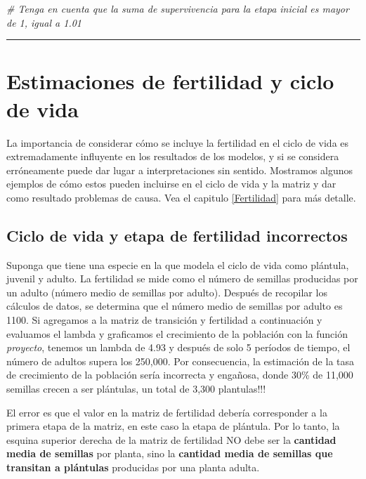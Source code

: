 \documentclass[
]{book}
\newenvironment{Shaded}{\begin{snugshade}}{\end{snugshade}}
\newcommand{\CommentTok}[1]{\textcolor[rgb]{0.56,0.35,0.01}{\textit{#1}}}
\theoremstyle{definition}
\theoremstyle{definition}
\theoremstyle{definition}
\theoremstyle{definition}
\theoremstyle{remark}
\begin{document}
\begin{Shaded}
\begin{Highlighting}[]
\CommentTok{\# Tenga en cuenta que la suma de supervivencia para la etapa inicial es mayor de 1, igual a 1.01}
\end{Highlighting}
\end{Shaded}

\begin{center}\rule{0.5\linewidth}{0.5pt}\end{center}

\section{Estimaciones de fertilidad y ciclo de vida}\label{estimaciones-de-fertilidad-y-ciclo-de-vida}

La importancia de considerar cómo se incluye la fertilidad en el ciclo de vida es extremadamente influyente en los resultados de los modelos, y si se considera erróneamente puede dar lugar a interpretaciones sin sentido. Mostramos algunos ejemplos de cómo estos pueden incluirse en el ciclo de vida y la matriz y dar como resultado problemas de causa. Vea el capitulo \ref{Fertilidad} para más detalle.

\subsection{Ciclo de vida y etapa de fertilidad incorrectos}\label{ciclo-de-vida-y-etapa-de-fertilidad-incorrectos}

Suponga que tiene una especie en la que modela el ciclo de vida como plántula, juvenil y adulto. La fertilidad se mide como el número de semillas producidas por un adulto (número medio de semillas por adulto). Después de recopilar los cálculos de datos, se determina que el número medio de semillas por adulto es 1100. Si agregamos a la matriz de transición y fertilidad a continuación y evaluamos el lambda y graficamos el crecimiento de la población con la función \emph{proyecto}, tenemos un lambda de 4.93 y después de solo 5 períodos de tiempo, el número de adultos supera los 250,000. Por consecuencia, la estimación de la tasa de crecimiento de la población sería incorrecta y engañosa, donde 30\% de 11,000 semillas crecen a ser plántulas, un total de 3,300 plantulas!!!

El error es que el valor en la matriz de fertilidad debería corresponder a la primera etapa de la matriz, en este caso la etapa de plántula. Por lo tanto, la esquina superior derecha de la matriz de fertilidad NO debe ser la \textbf{cantidad media de semillas} por planta, sino la \textbf{cantidad media de semillas que transitan a plántulas} producidas por una planta adulta.
\end{document}
